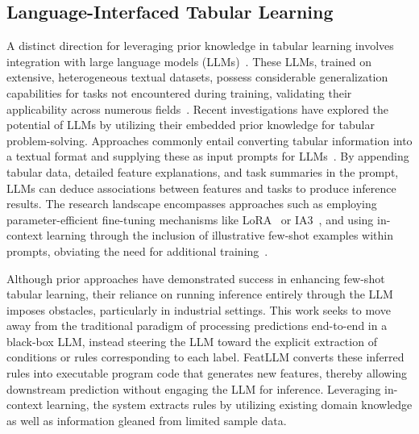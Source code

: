\subsection{Language-Interfaced Tabular Learning}

A distinct direction for leveraging prior knowledge in tabular learning involves integration with large language models (LLMs)~\cite{anil2023palm,openai2023gpt4}. These LLMs, trained on extensive, heterogeneous textual datasets, possess considerable generalization capabilities for tasks not encountered during training, validating their applicability across numerous fields~\cite{brown2020language}. Recent investigations have explored the potential of LLMs by utilizing their embedded prior knowledge for tabular problem-solving. Approaches commonly entail converting tabular information into a textual format and supplying these as input prompts for LLMs~\cite{dinh2022lift,hegselmann2023tabllm,wang2023anypredict}. By appending tabular data, detailed feature explanations, and task summaries in the prompt, LLMs can deduce associations between features and tasks to produce inference results. The research landscape encompasses approaches such as employing parameter-efficient fine-tuning mechanisms like LoRA~\cite{hu2021lora} or IA3~\cite{liu2022few}, and using in-context learning through the inclusion of illustrative few-shot examples within prompts, obviating the need for additional training~\cite{dinh2022lift,hegselmann2023tabllm,nam2023semi,slack2023tablet}.

Although prior approaches have demonstrated success in enhancing few-shot tabular learning, their reliance on running inference entirely through the LLM imposes obstacles, particularly in industrial settings. This work seeks to move away from the traditional paradigm of processing predictions end-to-end in a black-box LLM, instead steering the LLM toward the explicit extraction of conditions or rules corresponding to each label. \textsf{FeatLLM} converts these inferred rules into executable program code that generates new features, thereby allowing downstream prediction without engaging the LLM for inference. Leveraging in-context learning, the system extracts rules by utilizing existing domain knowledge as well as information gleaned from limited sample data.


